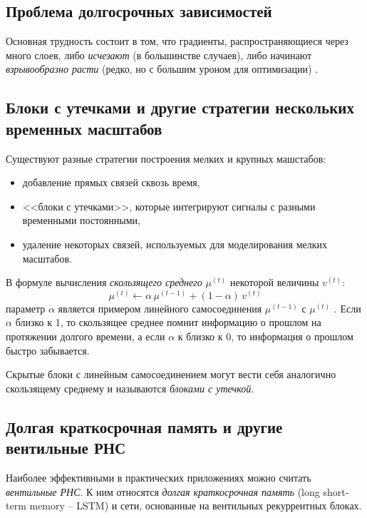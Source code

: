 \documentclass[%
	11pt,
	a4paper,
	utf8,
]{article}
\begin{document}
\subsection{Проблема долгосрочных зависимостей}

Основная трудность состоит в том, что градиенты, распространяющиеся через много слоев, либо \emph{исчезают} (в большинстве случаев), либо начинают \emph{взрывообразно расти} (редко, но с большим уроном для оптимизации) \cite[]{goodfellow:ml-2018}.

\subsection{Блоки с утечками и другие стратегии нескольких временных масштабов}

Существуют разные стратегии построения мелких и крупных машстабов:
\begin{itemize}
	\item добавление прямых связей сквозь время,
	
	\item <<блоки с утечками>>, которые интегрируют сигналы с разными временными постоянными,
	
	\item удаление некоторых связей, используемых для моделирования мелких масштабов.
\end{itemize}

В формуле вычисления \emph{скользящего среднего} $ \mu^{(t)} $ некоторой величины $ v^{(t)} $:
$$
\mu^{(t)} \leftarrow \alpha \, \mu^{(t - 1)} + (1 - \alpha) \, v^{(t)}
$$
параметр $ \alpha $ является примером линейного самосоединения $ \mu^{(t-1)} $ с $ \mu^{(t)} $ \cite[]{goodfellow:ml-2018}. Если $ \alpha $ близко к 1, то скользящее среднее помнит информацию о прошлом на протяжении долгого времени, а если $ \alpha $ к близко к 0, то информация о прошлом быстро забывается.

Скрытые блоки с линейным самосоединением могут вести себя аналогично скользящему среднему и называются \emph{блоками с утечкой}.

\subsection{Долгая краткосрочная память и другие вентильные РНС}

Наиболее эффективными в практических приложениях можно считать \emph{вентильные РНС}. К ним относятся \emph{долгая краткосрочная память} (long short-term memory -- LSTM) и сети, основанные на вентильных рекуррентных блоках.
\end{document}
